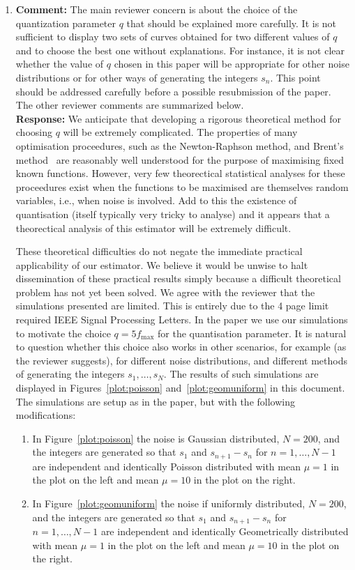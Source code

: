 \documentclass[a4paper,10pt]{article}
\begin{document}
\begin{enumerate}
\item\textbf{Comment:}
The main reviewer concern is about the choice of the quantization parameter
$q$ that should be explained more carefully. It is not sufficient to display two sets
of curves obtained for two different values of $q$ and to choose the best one without
explanations. For instance, it is not clear whether the value of $q$ chosen in this paper
will be appropriate for other noise distributions or for other ways of generating the
integers $s_n$. This point should be addressed carefully before a possible resubmission
of the paper. The other reviewer comments are summarized below.
\\
\textbf{Response:}
We anticipate that developing a rigorous theoretical method for choosing $q$ will be extremely complicated.  The properties of many optimisation proceedures, such as the Newton-Raphson method, and Brent's method~\cite[Ch.~5]{Brent_opt_no_derivs_1973} are reasonably well understood for the purpose of maximising fixed known functions. However, very few theorectical statistical analyses for these proceedures exist when the functions to be maximised are themselves random variables, i.e., when noise is involved.  Add to this the existence of quantisation (itself typically very tricky to analyse) and it appears that a theorectical analysis of this estimator will be extremely difficult.

These theoretical difficulties do not negate the immediate practical applicability of our estimator.  We believe it would be unwise to halt dissemination of these practical results simply because a difficult theoretical problem has not yet been solved.  We agree with the reviewer that the simulations presented are limited. This is entirely due to the 4 page limit required IEEE Signal Processing Letters.  In the paper we use our simulations to motivate the choice $q = 5 f_{\text{max}}$ for the quantisation parameter.  It is natural to question whether this choice also works in other scenarios, for example (as the reviewer suggests), for different noise distributions, and different methods of generating the integers $s_1,\dots,s_N$.  The results of such simulations are displayed in Figures~\ref{plot:poisson} and~\ref{plot:geomuniform} in this document. The simulations are setup as in the paper, but with the following modifications:

\begin{enumerate}
\item In Figure~\ref{plot:poisson} the noise is Gaussian distributed, $N=200$, and the integers are generated so that $s_1$ and $s_{n+1} - s_n$ for $n=1,\dots,N-1$ are independent and identically Poisson distributed with mean $\mu = 1$ in the plot on the left and mean $\mu=10$ in the plot on the right. 
\item In Figure~\ref{plot:geomuniform} the noise if uniformly distributed, $N=200$, and the integers are generated so that $s_1$ and $s_{n+1} - s_n$ for $n=1,\dots,N-1$ are independent and identically Geometrically distributed with mean $\mu = 1$ in the plot on the left and mean $\mu=10$ in the plot on the right. 
\end{enumerate}


\end{enumerate}
\end{document}
